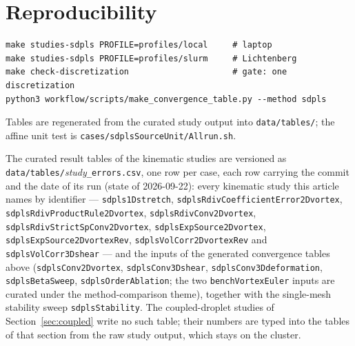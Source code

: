 \documentclass[preprint,3p,11pt]{elsarticle}
\begin{document}
\section*{Reproducibility}
\begin{verbatim}
make studies-sdpls PROFILE=profiles/local     # laptop
make studies-sdpls PROFILE=profiles/slurm     # Lichtenberg
make check-discretization                     # gate: one discretization
python3 workflow/scripts/make_convergence_table.py --method sdpls
\end{verbatim}
Tables are regenerated from the curated study output into
\texttt{data/tables/}; the affine unit test is
\texttt{cases/sdplsSourceUnit/Allrun.sh}.

\medskip
\noindent The curated result tables of the kinematic studies are versioned as
\texttt{data/tables/}\emph{study}\texttt{\_errors.csv}, one row per case, each row
carrying the commit and the date of its run (state of 2026-09-22): every kinematic
study this article names by identifier --- \texttt{sdpls1Dstretch},
\texttt{sdplsRdivCoefficientError2Dvortex}, \texttt{sdplsRdivProductRule2Dvortex},
\texttt{sdplsRdivConv2Dvortex}, \texttt{sdplsRdivStrictSpConv2Dvortex},
\texttt{sdplsExpSource2Dvortex}, \texttt{sdplsExpSource2DvortexRev},
\texttt{sdplsVolCorr2DvortexRev} and \texttt{sdplsVolCorr3Dshear} --- and the inputs
of the generated convergence tables above (\texttt{sdplsConv2Dvortex},
\texttt{sdplsConv3Dshear}, \texttt{sdplsConv3Ddeformation}, \texttt{sdplsBetaSweep},
\texttt{sdplsOrderAblation}; the two \texttt{benchVortexEuler} inputs are curated
under the method-comparison theme), together with the single-mesh stability sweep
\texttt{sdplsStability}. The coupled-droplet studies of Section~\ref{sec:coupled}
write no such table; their numbers are typed into the tables of that section from the
raw study output, which stays on the cluster.



\end{document}
